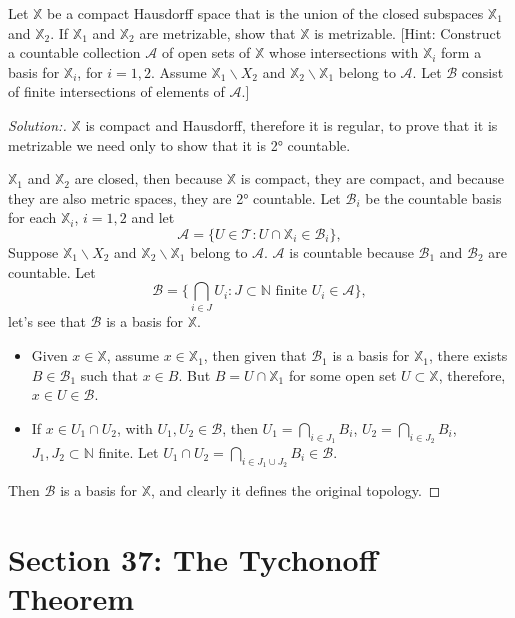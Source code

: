 \documentclass[a4paper,12pt, reqno]{article}
\theoremstyle{definition}
\newenvironment{exerr}[1]{
  \renewcommand\theexeralt{#1}
  \exeralt
}{\endexeralt}
\newenvironment{solution}{\begin{proof}[Solution:]}{\end{proof}}
\newcommand{\T}{\mathscr{T}}
\newcommand{\A}{\mathscr{A}}
\newcommand{\B}{\mathscr{B}}
\newcommand{\N}{\mathbb{N}}
\newcommand{\X}{\mathbb{X}}
\begin{document}
\begin{exerr}{9}
  Let $\X$ be a compact Hausdorff space that is the union of the closed subspaces $\X_{1}$ and $\X_{2}$. If $\X_{1}$ and $\X_{2}$ are metrizable, show that $\X$ is metrizable. [Hint: Construct a countable collection $\A$ of open sets of $\X$ whose intersections with $\X_{i}$ form a basis for $\X_{i}$, for $i=1,2$. Assume $\X_{1}\backslash X_{2}$ and $\X_{2}\backslash \X_{1}$ belong to $\A$. Let $\B$ consist of finite intersections of elements of $\A$.]
\end{exerr}
\begin{solution}
  $\X$ is compact and Hausdorff, therefore it is regular, to prove that it is metrizable we need only to show that it is 2° countable.

  $\X_{1}$ and $\X_{2}$ are closed, then because $\X$ is compact, they are compact, and because they are also metric spaces, they are 2° countable. Let $\B_{i}$ be the countable basis for each $\X_{i}$, $i=1,2$ and let 
  \begin{equation*}
      \A = \{ U\in \T : U\cap\X_{i}\in \B_{i} \},
  \end{equation*}
  Suppose $\X_{1}\backslash X_{2}$ and $\X_{2}\backslash \X_{1}$ belong to $\A$. $\A$ is countable because $\B_{1}$ and $\B_{2}$ are countable. Let
  \begin{equation*}
      \B = \{ \bigcap_{i\in J} U_{i} : J\subset\N \text{ finite }U_{i}\in \A \},
  \end{equation*}
  let's see that $\B$ is a basis for $\X$.
  \begin{itemize}
    \item Given $x\in\X$, assume $x\in\X_{1}$, then given that $\B_{1}$ is a basis for $\X_{1}$, there exists $B\in \B_{1}$ such that $x\in B$. But $B = U\cap\X_{1}$ for some open set $U\subset\X$, therefore, $x\in U\in\B$.
    \item If $x\in U_{1}\cap U_{2}$, with $U_{1},U_{2}\in\B$, then $U_{1} = \bigcap_{i\in J_{1}}B_{i}$, $U_{2} = \bigcap_{i\in J_{2}}B_{i}$, $J_{1},J_{2}\subset\N$ finite. Let $U_{1}\cap U_{2} = \bigcap_{i\in J_{1}\cup J_{2}} B_{i}\in \B$.
  \end{itemize}
  Then $\B$ is a basis for $\X$, and clearly it defines the original topology.
\end{solution}

\section*{Section 37: The Tychonoff Theorem}
\end{document}
